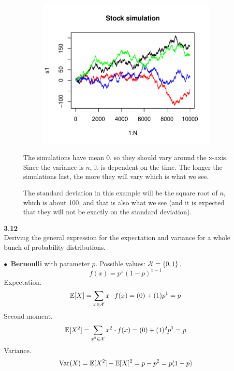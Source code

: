 \begin{figure}[H]
    \begin{minipage}{0.55\textwidth}
        \begin{figure}[H]
            \includegraphics[scale=0.6]{ch3_11.pdf}
        \end{figure}
    \end{minipage}
    \begin{minipage}{0.45\textwidth}
        \medskip\noindent
        The simulations have mean 0, so they should vary around the x-axis.
        Since the variance is $n$, it is dependent on the time. The longer
        the simulations last, the more they will vary which is what we see.

        \medskip\noindent The standard deviation in this example will be
        the square root of $n$, which is about 100, and that is also what
        we see (and it is expected that they will not be exactly on the standard
        deviation).
    \end{minipage}
\end{figure}

\newpage\noindent
\textbf{3.12}\\  %
Deriving the general expression for the expectation and variance for a whole bunch of
probability distributions.

\medskip\noindent$\bullet$ \textbf{Bernoulli} with parameter $p$. Possible values: $\mathcal{X} = \{0, 1\}$.
$$
f(x) = p^x(1-p)^{x-1}
$$
Expectation.
$$
\mathbb{E}[X] = \sum_{x\in\mathcal{X}} x\cdot f(x) = (0) + (1)p^1 = p
$$
Second moment.
$$
\mathbb{E}[X^2] = \sum_{x^2\in\mathcal{X}} x^2\cdot f(x) = (0) + (1)^2p^1 = p
$$
Variance.
$$
\text{Var}(X) = \mathbb{E}[X^2] - \mathbb{E}[X]^2 = p - p^2 = p(1 - p)
$$

